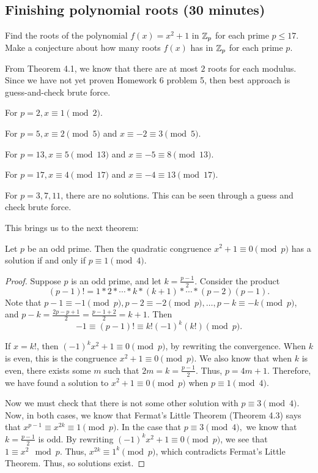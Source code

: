 \documentclass[letterpaper, 11 pt]{article}
\begin{document}
\subsection{Finishing polynomial roots (30 minutes)}
\begin{br}
 Find the roots of the polynomial $f(x) = x^2 +1$ in $\mathbb Z_p$ for each prime $p \leq 17$. Make a conjecture about how many roots $f(x)$ has in $\mathbb Z_p$ for each prime $p.$
\end{br}
\begin{solution}
From Theorem 4.1, we know that there are at most $2$ roots for each modulus. Since we have not yet proven Homework 6 problem 5, then best approach is guess-and-check brute force.

 For $p=2, x\equiv 1 \pmod 2$. 
 
 For $p=5, x\equiv2 \pmod 5$ and $x\equiv -2 \equiv 3 \pmod 5$.
 
For $p=13, x\equiv5 \pmod{13}$ and $x\equiv -5 \equiv 8 \pmod{13}$.
  
For $p=17, x\equiv4 \pmod {17}$ and $x\equiv -4 \equiv 13 \pmod{17}$.
   
 
 For $p=3,7, 11$, there are no solutions. This can be seen through a guess and check brute force.
\end{solution}

This brings us to the next theorem:

\begin{thm}[Theorem 4.6]
 Let $p$ be an odd prime. Then the quadratic congruence $x^2+1\equiv 0 \pmod p$ has a solution if and only if $p\equiv 1 \pmod 4$.
\end{thm}
\begin{proof}
 Suppose $p$ is an odd prime, and let $k=\frac{p-1}{2}$. Consider the product \[(p-1)!=1*2*\cdots*k*(k+1)*\cdots*(p-2)(p-1).\]
Note that $p-1\equiv -1\pmod p,p-2\equiv -2\pmod p, \dots, p-k\equiv -k\pmod p$, and $p-k=\frac{2p-p+1}{2}=\frac{p-1+2}{2}=k+1$. Then \[-1\equiv(p-1)!\equiv k! (-1)^k(k!)\pmod p.\] 

If $x=k!$, then $(-1)^kx^2+1\equiv 0 \pmod p$, by rewriting the convergence. When $k$ is even, this is the congruence $x^2+1\equiv 0 \pmod p$. We also know that when $k$ is even, there exists some $m$ such that $2m=k=\frac{p-1}{2}$. Thus, $p=4m+1$. Therefore, we have found a solution to $x^2+1\equiv 0 \pmod p$ when $p\equiv 1 \pmod 4$.

Now we must check that there is not some other solution with $p\equiv 3 \pmod 4$. Now, in both cases, we know that Fermat's Little Theorem (Theorem 4.3) says that $x^{p-1}\equiv x^{2k}\equiv 1 \pmod p$. 
In the case that $p\equiv 3 \pmod 4,$ we know that $k=\frac{p-1}{2}$ is odd. By rewriting $(-1)^kx^2+1\equiv 0 \pmod p$, we see that $1\equiv x^2 \mod p$. Thus, $x^{2k}\equiv 1^k \pmod p$, which contradicts Fermat's Little Theorem. Thus, so solutions exist.
\end{proof}
\end{document}

